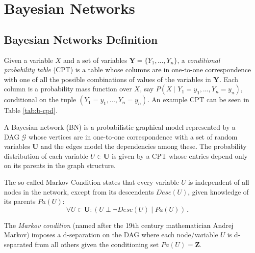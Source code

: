 \section{Bayesian Networks} \label{sec:bayesiannetworks}
\subsection{Bayesian Networks Definition}
Given a variable $X$ and a set of variables $\boldsymbol{Y} = \{Y_1, ..., Y_n\}$, a \textit{conditional probability table} (CPT) is a table whose columns are in one-to-one correspondence with one of all the possible combinations of values of the variables in $\boldsymbol{Y}$. 
Each column is a probability mass function over $X$, say $P(X \mid Y_1=y_1, \ldots ,Y_n=y_n)$, conditional on the tuple $(Y_1=y_1, \ldots ,Y_n=y_n)$.
An example CPT can be seen in Table \ref{tab:b-cpd}.

\begin{definition} \label{def:bayesian-network}
	A Bayesian network (BN) is a probabilistic graphical model represented by a DAG $\mathcal{G}$ whose vertices are in one-to-one correspondence with a set of random variables $\boldsymbol{U}$ and the edges model the dependencies among these.
	The probability distribution of each variable $U \in \boldsymbol{U}$ is given by a CPT whose entries depend only on its parents in the graph structure.
	
	The so-called Markov Condition states that every variable $U$ is independent of all nodes in the network, except from its descendents $Desc(U)$, given knowledge of its parents $Pa(U)$:
	\begin{equation*}
		\forall U \in \boldsymbol{U}:  ( U \perp \neg Desc(U) \mid Pa(U)) \,.
	\end{equation*}
\end{definition}
The \textit{Markov condition} (named after the 19th century mathematician Andrej Markov) imposes a d-separation on the DAG where each node/variable $U$ is d-separated from all others given the conditioning set $Pa(U) = \boldsymbol{Z}$.

